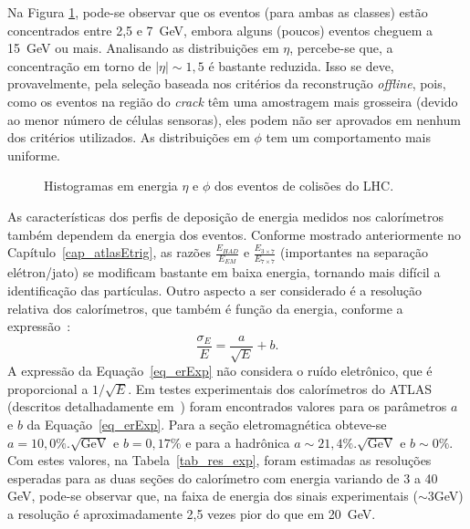 Na Figura \ref{fig_carexp}, pode-se observar que os eventos (para
ambas as classes) estão concentrados entre 2,5 e 7~GeV, embora
alguns (poucos) eventos cheguem a 15~GeV ou mais. Analisando as
distribuições em $\eta$, percebe-se que, a concentração em torno
de $|\eta|\sim 1,5$ é bastante reduzida. Isso se deve,
provavelmente, pela seleção baseada nos critérios da reconstrução
\emph{offline}, pois, como os eventos na região do \emph{crack}
têm uma amostragem mais grosseira (devido ao menor número de
células sensoras), eles podem não ser aprovados em nenhum dos
critérios utilizados. As distribuições em $\phi$ tem um
comportamento mais uniforme.

\begin{figure}[bth]
\begin{minipage}[b]{0.48\linewidth}
  \centering
 \centerline{}
\end{minipage}
\hfill
\begin{minipage}[b]{0.48\linewidth}
  \centering
 \centerline{}
\end{minipage}
\hfill \linebreak
\begin{minipage}[b]{0.98\linewidth}
  \centering
 \centerline{}
\end{minipage}
\caption{Histogramas em energia $\eta$ e $\phi$ dos eventos de
colisões do LHC.}\label{fig_carexp}
\end{figure}

As características dos perfis de deposição de energia medidos nos
calorímetros também dependem da energia dos eventos. Conforme
mostrado anteriormente no Capítulo~\ref{cap_atlasEtrig}, as razões
$\frac{E_{HAD}}{E_{EM}}$ e $\frac{E_{3 \times 7}}{E_{7 \times 7}}$
(importantes na separação elétron/jato) se modificam bastante em
baixa energia, tornando mais difícil a identificação das
partículas. Outro aspecto a ser considerado é a resolução relativa
dos calorímetros, que também é função da energia, conforme a
expressão~\cite{book:wigmans:2000}:
\begin{equation}\label{eq_erExp}
 \frac{\sigma_E}{E}=\frac{a}{\sqrt{E}}+b.
\end{equation}
A expressão da Equação~\ref{eq_erExp} não considera o ruído
eletrônico, que é proporcional a $1/\sqrt{E}$. Em testes
experimentais dos calorímetros do ATLAS (descritos detalhadamente
em~\cite{article:ATLAS:2008}) foram encontrados valores para os
parâmetros $a$ e $b$ da Equação~\ref{eq_erExp}. Para a seção
eletromagnética obteve-se $a=10,0\%.\sqrt{\text{GeV}}$ e
$b=0,17\%$ e para a hadrônica $a\sim 21,4 \%.\sqrt{\text{GeV}}$ e
$b\sim 0 \%$. Com estes valores, na Tabela~\ref{tab_res_exp},
foram estimadas as resoluções esperadas para as duas seções do
calorímetro com energia variando de 3 a 40 GeV, pode-se observar
que, na faixa de energia dos sinais experimentais ($\sim$3GeV) a
resolução é aproximadamente 2,5 vezes pior do que em 20~GeV.

